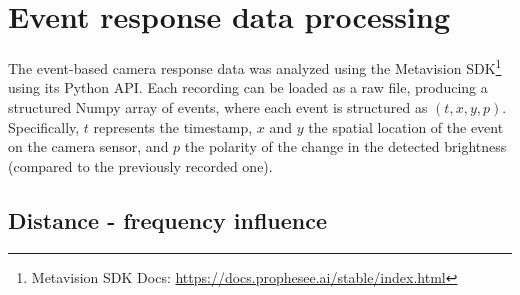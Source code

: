 
\section{Event response data processing}

The event-based camera response data was analyzed using the Metavision SDK\footnote{Metavision SDK Docs: \url{https://docs.prophesee.ai/stable/index.html}}
using its Python API. Each recording can be loaded as a raw file, producing a structured Numpy array of events, where each event is structured as
$(t, x, y, p)$. Specifically, $t$ represents the timestamp, $x$ and $y$ the spatial location of the event
on the camera sensor, and $p$ the polarity of the change in the detected brightness (compared to the previously recorded one).

\subsection{Distance - frequency influence}

